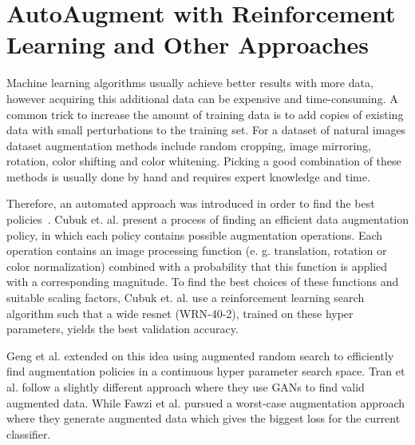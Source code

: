 \documentclass[10pt,twocolumn,letterpaper]{article}
\begin{document}
\section{AutoAugment with Reinforcement Learning and Other Approaches}
Machine learning algorithms usually achieve better results with more data, however acquiring this additional data can be expensive and time-consuming.  A common trick to increase the amount of training data is to add copies of existing data with small perturbations to the training set. For a dataset of natural images dataset augmentation methods include random cropping, image mirroring, rotation, color shifting and color whitening. Picking a good combination of these methods is usually done by hand and requires expert knowledge and time.
\par
Therefore, an automated approach was introduced in order to find the best policies~\cite{Ekin}. Cubuk et. al. present a process of finding an efficient data augmentation policy, in which each policy contains possible augmentation operations. Each operation contains an image processing function (e. g. translation, rotation or color normalization) combined with a probability that this function is applied with a corresponding magnitude. To find the best choices of these functions and suitable scaling factors, Cubuk et. al. use a reinforcement learning search algorithm such that a wide resnet (WRN-40-2), trained on these hyper parameters, yields the best validation accuracy. 
\par
Geng et al. \cite{DBLP:journals/corr/abs-1811-04768} extended on this idea using augmented random search to efficiently find augmentation policies in a continuous hyper parameter search space. Tran et al. \cite{DBLP:journals/corr/abs-1710-10564} follow a slightly different approach where they use GANs to find valid augmented data. While Fawzi et al. \cite{Fawzi} pursued a worst-case augmentation approach where they generate augmented data which gives the biggest loss for the current classifier.
\end{document}
